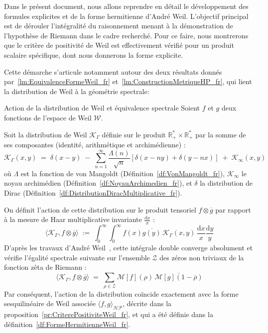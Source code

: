 \documentclass[Riemann_Hypothesis.tex]{subfiles}
\begin{document}
Dans le présent document, nous allons reprendre en détail le développement des 
formules explicites et de la forme hermitienne d'André Weil. L'objectif principal 
est de dérouler l'intégralité du raisonnement menant à la démonstration de 
l'hypothèse de Riemann dans le cadre recherché. Pour ce faire, 
nous montrerons que le critère de positivité 
de Weil est effectivement vérifié pour un produit scalaire spécifique, dont nous 
donnerons la forme explicite.

Cette démarche s'articule notamment autour des deux résultats donnés 
par~\ref{lm:EquivalenceFormeWeil_fr} et~\ref{lm:ConstructionMetriqueHP_fr}, 
qui lient la distribution de Weil à la géométrie spectrale:

\begin{lemma}[label=lm:EquivalenceFormeWeil_fr_intro]{Action de la distribution de Weil et équivalence spectrale}
    Soient $f$ et $g$ deux fonctions de l'espace de Weil $\mathcal{W}$. \par
    Soit la distribution de Weil $\mathcal{K}_{\Gamma}$ définie sur le produit $\mathbb{R}_+^* \times \mathbb{R}_+^*$ par la somme de ses composantes (identité, arithmétique et archimédienne) :
    \begin{equation*}
        \mathcal{K}_{\Gamma}(x,y) \;=\; \delta(x-y) \;-\; \sum_{n=1}^{\infty} \frac{\Lambda(n)}{\sqrt{n}} \left[ \delta\left(x - ny\right) + \delta\left(y - nx\right) \right] \;+\; \mathcal{K}_{\infty}(x,y)
    \end{equation*}
    où $\Lambda$ est la fonction de von Mangoldt (Définition~\ref{df:VonMangoldt_fr}), 
    $\mathcal{K}_{\infty}$ le noyau archimédien (Définition~\ref{df:NoyauArchimedien_fr}), 
    et $\delta$ la distribution de Dirac 
    (Définition~\ref{df:DistributionDiracMultiplicative_fr}). \par
    On définit l'action de cette distribution sur le produit tensoriel $f \otimes \overline{g}$ par rapport à la mesure de Haar multiplicative invariante $\frac{\mathrm{d}x}{x}$ :
    \begin{equation*}
        \langle \mathcal{K}_{\Gamma}, f \otimes \overline{g} \rangle \;:=\; \int_{0}^{\infty} \int_{0}^{\infty} f(x) \overline{g(y)} \, \mathcal{K}_{\Gamma}(x,y) \, \frac{\mathrm{d}x}{x} \frac{\mathrm{d}y}{y}
    \end{equation*}
    D'après les travaux d'André Weil~\cite{weil1952_formules}, cette intégrale double converge absolument et vérifie l'égalité spectrale suivante sur l'ensemble $\mathcal{Z}$ des zéros non triviaux de la fonction zêta de Riemann :
    \begin{equation*}
        \langle \mathcal{K}_{\Gamma}, f \otimes \overline{g} \rangle \;=\; \sum_{\rho \in \mathcal{Z}} \mathcal{M}[f](\rho) \, \overline{\mathcal{M}[g](1 - \overline{\rho})}
    \end{equation*}
    Par conséquent, l'action de la distribution coïncide exactement avec la forme
    sesquilinéaire de Weil associée $\langle f, g \rangle_{\mathcal{HP}}$,
    décrite dans la
    proposition~\ref{pr:CriterePositiviteWeil_fr},
    et qui a été définie dans la définition~\ref{df:FormeHermitienneWeil_fr}.
\end{lemma}
\end{document}
